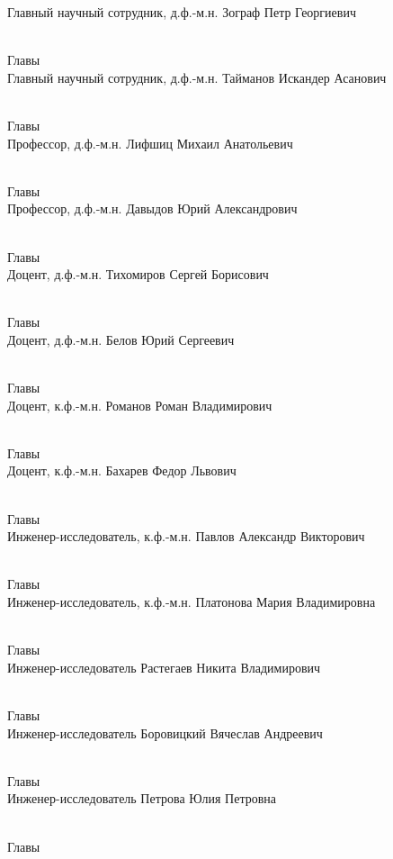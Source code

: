 \newcommand{\persondescr}[3]{#1 \hfill 
	#2 \\~ \strut\hfill #3}


\vspace*{1cm}
\persondescr{Главный научный сотрудник, д.ф.-м.н.}{Зограф Петр Георгиевич}{Главы
	} \\

\persondescr{Главный научный сотрудник, д.ф.-м.н.}{Тайманов Искандер Асанович}{Главы
	} \\

\persondescr{Профессор, д.ф.-м.н.}{Лифшиц Михаил Анатольевич}{Главы
	} \\

\persondescr{Профессор, д.ф.-м.н.}{Давыдов Юрий Александрович}{Главы
	} \\

\persondescr{Доцент, д.ф.-м.н.}{Тихомиров Сергей Борисович}{Главы
	} \\

\persondescr{Доцент, д.ф.-м.н.}{Белов Юрий Сергеевич}{Главы
	} \\

\persondescr{Доцент, к.ф.-м.н.}{Романов Роман Владимирович}{Главы
	} \\

\persondescr{Доцент, к.ф.-м.н.}{Бахарев Федор Львович}{Главы
	} \\

\persondescr{Инженер-исследователь, к.ф.-м.н.}{Павлов Александр Викторович}{Главы
	} \\

\persondescr{Инженер-исследователь, к.ф.-м.н.}{Платонова Мария Владимировна}{Главы
	} \\

\persondescr{Инженер-исследователь}{Растегаев Никита Владимирович}{Главы
	} \\

\persondescr{Инженер-исследователь}{Боровицкий Вячеслав Андреевич}{Главы
	} \\

\persondescr{Инженер-исследователь}{Петрова Юлия Петровна}{Главы
	} \\

